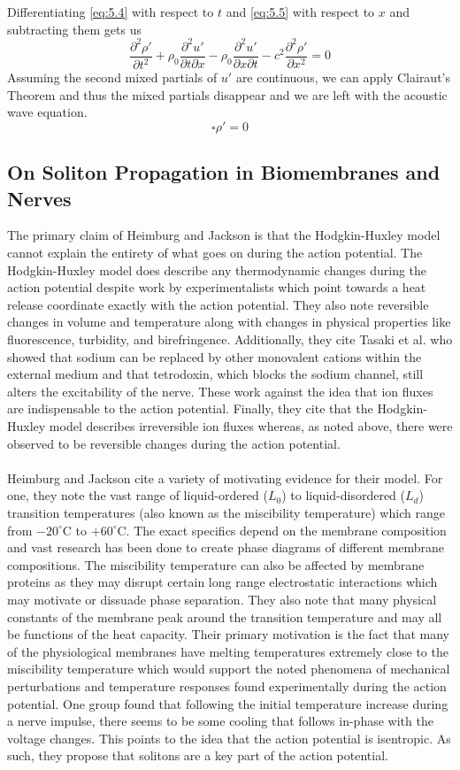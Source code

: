 \documentclass{article}
\newcommand{\pdt}[2]{\frac{\partial ^2 #1}{\partial #2 ^2}}
\newcommand{\pdm}[3]{\frac{\partial^2 #1}{\partial#2 \partial #3}}
\numberwithin{equation}{section}
\begin{document}
Differentiating \eqref{eq:5.4} with respect to $t$ and \eqref{eq:5.5} with respect to $x$ and subtracting them gets us 
\begin{equation}
    \pdt{\rho'}{t} + \rho_0 \pdm{u'}{t}{x} - \rho_0 \pdm{u'}{x}{t} -c^2 \pdt{\rho ' }{x} = 0
\end{equation}
Assuming the second mixed partials of $u'$ are continuous, we can apply Clairaut's Theorem and thus the mixed partials disappear and we are left with the acoustic wave equation.
\begin{equation}
    \square \rho' = 0
\end{equation}
\subsection{On Soliton Propagation in Biomembranes and Nerves}
The primary claim of Heimburg and Jackson is that the Hodgkin-Huxley model cannot explain the entirety of what goes on during the action potential. The Hodgkin-Huxley model does describe any thermodynamic changes during the action potential despite work by experimentalists which point towards a heat release coordinate exactly with the action potential. They also note reversible changes in volume and temperature along with changes in physical properties like fluorescence, turbidity, and birefringence. Additionally, they cite Tasaki et al. who showed that sodium can be replaced by other monovalent cations within the external medium and that tetrodoxin, which blocks the sodium channel, still alters the excitability of the nerve. These work against the idea that ion fluxes are indispensable to the action potential. Finally, they cite that the Hodgkin-Huxley model describes irreversible ion fluxes whereas, as noted above, there were observed to be reversible changes during the action potential. \\\\
Heimburg and Jackson cite a variety of motivating evidence for their model. For one, they note the vast range of liquid-ordered ($L_0$) to liquid-disordered ($L_d$) transition temperatures (also known as the miscibility temperature) which range from $-20^\circ $C to $+60^\circ$C. The exact specifics depend on the membrane composition and vast research has been done to create phase diagrams of different membrane compositions. The miscibility temperature can also be affected by membrane proteins as they may disrupt certain long range electrostatic interactions which may motivate or dissuade phase separation. They also note that many physical constants of the membrane peak around the transition temperature and may all be functions of the heat capacity. Their primary motivation is the fact that many of the physiological membranes have melting temperatures extremely close to the miscibility temperature which would support the noted phenomena of mechanical perturbations and temperature responses found experimentally during the action potential. One group found that following the initial temperature increase during a nerve impulse, there seems to be some cooling that follows in-phase with the voltage changes. This points to the idea that the action potential is isentropic. As such, they propose that solitons are a key part of the action potential. \\\\
\end{document}
